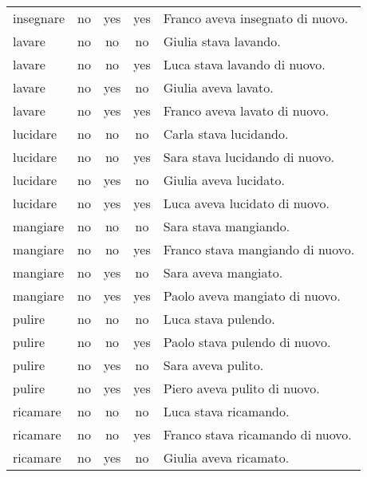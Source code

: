 \begin{longtable}{l|ccc|p{5cm}}
insegnare      & no   & yes        & yes       & Franco aveva insegnato di nuovo.      \\
lavare         & no   & no         & no        & Giulia stava lavando.                 \\
lavare         & no   & no         & yes       & Luca stava lavando di nuovo.          \\
lavare         & no   & yes        & no        & Giulia aveva lavato.                  \\
lavare         & no   & yes        & yes       & Franco aveva lavato di nuovo.         \\
lucidare       & no   & no         & no        & Carla stava lucidando.                \\
lucidare       & no   & no         & yes       & Sara stava lucidando di nuovo.        \\
lucidare       & no   & yes        & no        & Giulia aveva lucidato.                \\
lucidare       & no   & yes        & yes       & Luca aveva lucidato di nuovo.         \\
mangiare       & no   & no         & no        & Sara stava mangiando.                 \\
mangiare       & no   & no         & yes       & Franco stava mangiando di nuovo.      \\
mangiare       & no   & yes        & no        & Sara aveva mangiato.                  \\
mangiare       & no   & yes        & yes       & Paolo aveva mangiato di nuovo.        \\
pulire         & no   & no         & no        & Luca stava pulendo.                   \\
pulire         & no   & no         & yes       & Paolo stava pulendo di nuovo.         \\
pulire         & no   & yes        & no        & Sara aveva pulito.                    \\
pulire         & no   & yes        & yes       & Piero aveva pulito di nuovo.          \\
ricamare       & no   & no         & no        & Luca stava ricamando.                 \\
ricamare       & no   & no         & yes       & Franco stava ricamando di nuovo.      \\
ricamare       & no   & yes        & no        & Giulia aveva ricamato.                \\

\end{longtable}
